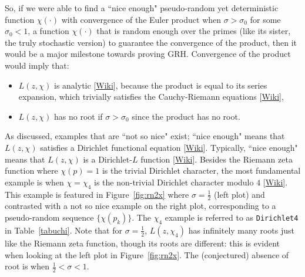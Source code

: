 \documentclass[oneside,10pt]{book}
\begin{document}
So, if we were able to find a ``nice enough" pseudo-random yet deterministic function $\chi(\cdot)$ with convergence of the
 Euler product when $\sigma>\sigma_0$ for some $\sigma_0<1$, a function $\chi(\cdot)$ that is random enough over the primes (like its sister, the truly stochastic version) to guarantee the convergence of the product, then it would be a major milestone towards proving GRH. Convergence of the product would imply that:
\begin{itemize}
\item $L(z,\chi)$ is \textcolor{index}{analytic} [\href{https://en.wikipedia.org/wiki/Analytic_function}{Wiki}], because  the product is equal to its series expansion, which trivially satisfies the \textcolor{index}{Cauchy-Riemann equations} [\href{https://en.wikipedia.org/wiki/Cauchy\%E2\%80\%93Riemann_equations}{Wiki}],
\item $L(z,\chi)$ has no root if $\sigma>\sigma_0$ since the product has no root.
\end{itemize}
As discussed, examples that are ``not so nice" exist; ``nice enough" means that $L(z,\chi)$ satisfies a
 \textcolor{index}{Dirichlet functional equation} [\href{https://en.wikipedia.org/wiki/Functional_equation_(L-function)}{Wiki}]. Typically, ``nice enough"
 means that $L(z,\chi)$ is a \textcolor{index}{Dirichlet-$L$ function} [\href{https://en.wikipedia.org/wiki/Dirichlet_L-function}{Wiki}]. Besides the \textcolor{index}{Riemann zeta function} where $\chi(p)=1$ is the trivial Dirichlet character, the most
 fundamental example is when $\chi=\chi_4$ is the non-trivial \textcolor{index}{Dirichlet character modulo $4$} [\href{https://en.wikipedia.org/wiki/Dirichlet_character}{Wiki}]. This example is featured in Figure~\ref{fig:rn2x} where $\sigma=\frac{1}{2}$ (left plot) and contrasted with a not so nice example on the right plot, corresponding to a pseudo-random sequence $\{\chi(p_k)\}$. The $\chi_4$ example
 is referred to as \texttt{Dirichlet4} in Table~\ref{tabuchi}. Note that for $\sigma=\frac{1}{2}$, $L(z,\chi_4)$ has infinitely many roots just like the Riemann zeta function, though its roots are different: this is evident when looking at the left plot in Figure~\ref{fig:rn2x}. The (conjectured) absence of root is when $\frac{1}{2}<\sigma<1$.
\end{document}
